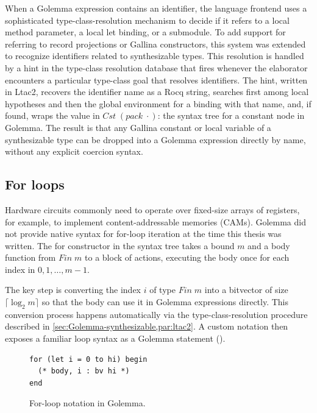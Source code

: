 \documentclass[fontset=fira-newtxsf]{mitthesis}
\theoremstyle{definition}
\theoremstyle{plain}
\begin{document}
When a Golemma expression contains an identifier, the language frontend uses a sophisticated type-class-resolution mechanism to decide if it refers to a local method parameter, a local let binding, or a submodule.
To add support for referring to record projections or Gallina constructors, this system was extended to recognize identifiers related to synthesizable types.
This resolution is handled by a hint in the type-class resolution database that fires whenever the elaborator encounters a particular type-class goal that resolves identifiers.
The hint, written in Ltac2, recovers the identifier name as a Rocq string, searches first among local hypotheses and then the global environment for a binding with that name, and, if found, wraps the value in $\mathit{Cst}\;(\mathit{pack}\;\cdot)$: the syntax tree for a constant node in Golemma.
The result is that any Gallina constant or local variable of a synthesizable type can be dropped into a Golemma expression directly by name, without any explicit coercion syntax.

\subsection{For loops} \label{sec:Golemma-for}

Hardware circuits commonly need to operate over fixed-size arrays of registers, for example, to implement content-addressable memories (CAMs).
Golemma did not provide native syntax for for-loop iteration at the time this thesis was written.  The for constructor in the syntax tree takes a bound $m$ and a body function from $\mathit{Fin}\;\mathit{m}$ to a block of actions, executing the body once for each index in \(0, 1, \ldots, m-1\).

The key step is converting the index $\mathit{i}$ of type $\mathit{Fin}\;\mathit{m}$ into a bitvector of size $\lceil \log_2{m} \rceil$ so that the body can use it in Golemma expressions directly.
This conversion process happens automatically via the type-class-resolution procedure described in \cref{sec:Golemma-synthesizable,par:ltac2}.
A custom notation then exposes a familiar loop syntax as a Golemma statement ().

\begin{figure}[H]
\begin{verbatim}
for (let i = 0 to hi) begin
  (* body, i : bv hi *)
end
\end{verbatim}
\caption[For-loop notation]{For-loop notation in Golemma.}
\label{fig:Golemma-for-notation}
\end{figure}
\end{document}
